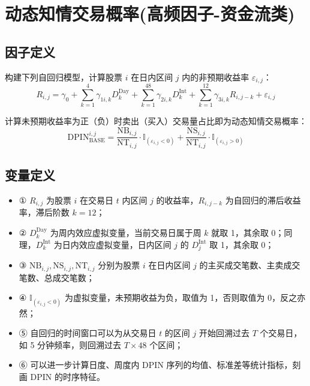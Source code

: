 \documentclass{article}
\begin{document}
\section{动态知情交易概率(高频因子-资金流类)}

\subsection{因子定义}

构建下列自回归模型，计算股票 \( i \) 在日内区间 \( j \) 内的非预期收益率 \( \varepsilon_{i,j} \)：
\begin{equation}
    R_{i,j} = \gamma_0 + \sum_{k=1}^{4} \gamma_{1i,k} D_k^{\mathrm{Day}} + \sum_{k=1}^{48} \gamma_{2i,k} D_k^{\mathrm{Int}} + \sum_{k=1}^{12} \gamma_{3i,k} R_{i,j-k} + \varepsilon_{i,j}
\end{equation}

计算未预期收益率为正（负）时卖出（买入）交易量占比即为动态知情交易概率：
\begin{equation}
    \mathrm{DPIN}_{\mathrm{BASE}}^{i,j} = \frac{\mathrm{NB}_{i,j}}{\mathrm{NT}_{i,j}} \cdot \mathbb{I}_{(\varepsilon_{i,j} < 0)} + \frac{\mathrm{NS}_{i,j}}{\mathrm{NT}_{i,j}} \cdot \mathbb{I}_{(\varepsilon_{i,j} > 0)}
\end{equation}

\subsection{变量定义}
\begin{itemize}
    \item ① \( R_{i,j} \) 为股票 \( i \) 在交易日 \( t \) 内区间 \( j \) 的收益率，\( R_{i,j-k} \) 为自回归的滞后收益率，滞后阶数 \( k=12 \)；
    \item ② \( D_k^{\mathrm{Day}} \) 为周内效应虚拟变量，当前交易日属于周 \( k \) 就取 1，其余取 0；同理，\( D_k^{\mathrm{Int}} \) 为日内效应虚拟变量，日内区间 \( j \) 的 \( D_j^{\mathrm{Int}} \) 取 1，其余取 0；
    \item ③ \( \mathrm{NB}_{i,j}, \mathrm{NS}_{i,j}, \mathrm{NT}_{i,j} \) 分别为股票 \( i \) 在日内区间 \( j \) 的主买成交笔数、主卖成交笔数、总成交笔数；
    \item ④ \( \mathbb{I}_{(\varepsilon_{i,j} < 0)} \) 为虚拟变量，未预期收益为负，取值为 1，否则取值为 0，反之亦然；
    \item ⑤ 自回归的时间窗口可以为从交易日 \( t \) 的区间 \( j \) 开始回溯过去 \( T \) 个交易日，如 5 分钟频率，则回溯过去 \( T \times 48 \) 个区间；
    \item ⑥ 可以进一步计算日度、周度内 DPIN 序列的均值、标准差等统计指标，刻画 DPIN 的时序特征。
\end{itemize}
\end{document}
